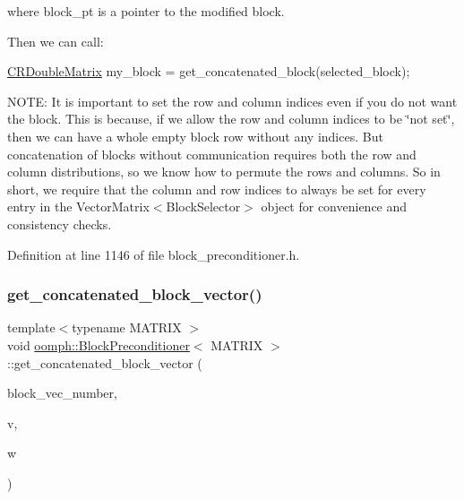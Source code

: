 where block\+\_\+pt is a pointer to the modified block.

Then we can call\+:

\hyperlink{classoomph_1_1CRDoubleMatrix}{C\+R\+Double\+Matrix} my\+\_\+block = get\+\_\+concatenated\+\_\+block(selected\+\_\+block);

N\+O\+TE\+: It is important to set the row and column indices even if you do not want the block. This is because, if we allow the row and column indices to be \char`\"{}not set\char`\"{}, then we can have a whole empty block row without any indices. But concatenation of blocks without communication requires both the row and column distributions, so we know how to permute the rows and columns. So in short, we require that the column and row indices to always be set for every entry in the Vector\+Matrix$<$\+Block\+Selector$>$ object for convenience and consistency checks. 

Definition at line 1146 of file block\+\_\+preconditioner.\+h.

\mbox{\label{classoomph_1_1BlockPreconditioner_af9321cdab3f506ab95fe51cd9b93deab}} 
\subsubsection{\texorpdfstring{get\+\_\+concatenated\+\_\+block\+\_\+vector()}{get\_concatenated\_block\_vector()}}
{\footnotesize\ttfamily template$<$typename M\+A\+T\+R\+IX $>$ \\
void \hyperlink{classoomph_1_1BlockPreconditioner}{oomph\+::\+Block\+Preconditioner}$<$ M\+A\+T\+R\+IX $>$\+::get\+\_\+concatenated\+\_\+block\+\_\+vector (\begin{DoxyParamCaption}\item[{const \hyperlink{classoomph_1_1Vector}{Vector}$<$ unsigned $>$ \&}]{block\+\_\+vec\+\_\+number,  }\item[{const \hyperlink{classoomph_1_1DoubleVector}{Double\+Vector} \&}]{v,  }\item[{\hyperlink{classoomph_1_1DoubleVector}{Double\+Vector} \&}]{w }\end{DoxyParamCaption})}



